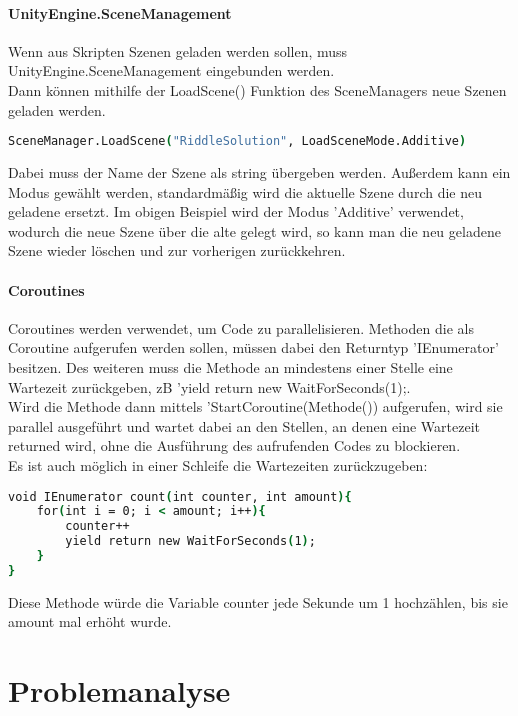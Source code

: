 \subsubsection{UnityEngine.SceneManagement}
\label{Grundlagen:SceneManagement}
Wenn aus Skripten Szenen geladen werden sollen, muss UnityEngine.SceneManagement eingebunden werden.\\
Dann können mithilfe der LoadScene() Funktion des SceneManagers neue Szenen geladen werden.
\begin{lstlisting}[language=csh, caption={Laden einer Szene im Skript}]
SceneManager.LoadScene("RiddleSolution", LoadSceneMode.Additive)
\end{lstlisting}
Dabei muss der Name der Szene als string übergeben werden. Außerdem kann ein Modus gewählt werden, standardmäßig wird die aktuelle Szene durch die neu geladene ersetzt. Im obigen Beispiel wird der Modus 'Additive' verwendet, wodurch die neue Szene über die alte gelegt wird, so kann man die neu geladene Szene wieder löschen und zur vorherigen zurückkehren.

\subsubsection{Coroutines}
\label{Grundlagen:Coroutines}
Coroutines werden verwendet, um Code zu parallelisieren. Methoden die als Coroutine aufgerufen werden sollen, müssen dabei den Returntyp 'IEnumerator' besitzen. Des weiteren muss die Methode an mindestens einer Stelle eine Wartezeit zurückgeben, zB 'yield return new WaitForSeconds(1);.\\
Wird die Methode dann mittels 'StartCoroutine(Methode()) aufgerufen, wird sie parallel ausgeführt und wartet dabei an den Stellen, an denen eine Wartezeit returned wird, ohne die Ausführung des aufrufenden Codes zu blockieren.\\
Es ist auch möglich in einer Schleife die Wartezeiten zurückzugeben:
\begin{lstlisting}[language=csh, caption={Laden einer Szene im Skript}]
void IEnumerator count(int counter, int amount){
	for(int i = 0; i < amount; i++){
		counter++
		yield return new WaitForSeconds(1);	
	}
}
\end{lstlisting}
Diese Methode würde die Variable counter jede Sekunde um 1 hochzählen, bis sie amount mal erhöht wurde.

\chapter{Problemanalyse}
\label{cha:problemanalyse}


